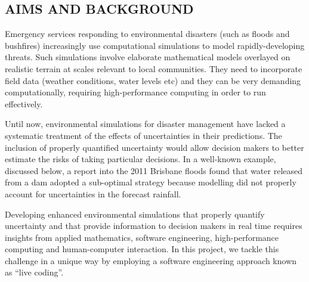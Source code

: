 \subsection*{AIMS AND BACKGROUND}

Emergency services responding to environmental disasters (such as
floods and bushfires) increasingly use computational simulations
to model rapidly-developing threats. Such simulations involve elaborate mathematical models
overlayed on realistic terrain at scales relevant to local
communities. They need to incorporate field data (weather conditions,
water levels etc) and they can be very demanding computationally,
requiring high-performance computing in order to run effectively.

Until now, environmental simulations for disaster management have lacked a systematic treatment of the effects of uncertainties in their predictions. The inclusion of properly quantified uncertainty would allow decision makers to better estimate the risks of taking particular decisions. In a well-known example, discussed below, a report into the 2011 Brisbane floods found that water released from a dam adopted a sub-optimal strategy because modelling did not properly account for uncertainties in the forecast rainfall.

Developing enhanced environmental simulations that properly quantify uncertainty and that provide information to decision makers in real time requires insights from applied mathematics, software engineering, high-performance computing and human-computer interaction. In this project, we tackle this challenge in a unique way by employing a software engineering approach  known as ``live coding''. 



\iffalse
 In
order to be useful for decision makers, simulations need to
accommodate rapidly-changing scenarios and streaming data, and they need
to properly quantify and communicate the uncertainty in
their predictions. Developing such simulations requires insights from
applied mathematics, software engineering, high-performance computing
and human-computer interaction.



When systems are disrupted during environmental disasters (for example,
during floods, storm surges or tsunamis) information from
computational simulation is needed urgently to aid decision-making by
emergency services. This is not simply a matter of compute power but
requires insight from applied mathematics, software
engineering, human computer interaction, high performance computing
and data visualisation. All of these facets need to be tightly coupled
and {\bf tested in realistic  decision-making
scenarios} where decision makers collaborate with modelling experts. In
particular, a crucial aspect of advice provided from modellers to
decision makers is to {\bf properly quantify and communicate the
{uncertainty}} in predictions obtained by computer simulations.
This advice needs to be provided in a timely manner and in a context
where the computer support may vary dramatically due to
system outages.
\fi

